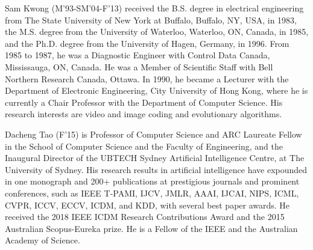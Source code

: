 \documentclass[journal]{IEEEtran}
\begin{document}
\vspace{-10 mm}
\begin{IEEEbiography}{Sam Kwong}
(M'93-SM'04-F'13) received the B.S. degree in electrical engineering from The State University of New York at Buffalo, Buffalo, NY, USA, in 1983, the M.S. degree from the University of Waterloo, Waterloo, ON, Canada, in 1985, and the Ph.D. degree from the University of Hagen, Germany, in 1996. From 1985 to 1987, he was a Diagnostic Engineer with Control Data Canada, Mississauga, ON, Canada. He was a Member of Scientific Staff with Bell Northern Research Canada, Ottawa. In 1990, he became a Lecturer with the Department of Electronic Engineering, City University of Hong Kong, where he is currently a Chair Professor with the Department of Computer Science. His research interests are video and image coding and evolutionary algorithms.
\end{IEEEbiography}
\vspace{-10 mm}
\begin{IEEEbiography}{Dacheng Tao}
(F'15) is Professor of Computer Science and ARC Laureate Fellow in the School of Computer Science and the Faculty of Engineering, and the Inaugural Director of the UBTECH Sydney Artificial Intelligence Centre, at The University of Sydney. His research results in artificial intelligence have expounded in one monograph and 200+ publications at prestigious journals and prominent conferences, such as IEEE T-PAMI, IJCV, JMLR, AAAI, IJCAI, NIPS, ICML, CVPR, ICCV, ECCV, ICDM, and KDD, with several best paper awards. He received the 2018 IEEE ICDM Research Contributions Award and the 2015 Australian Scopus-Eureka prize. He is a Fellow of the IEEE and the Australian Academy of Science.
\end{IEEEbiography}








\flushbottom
\end{document}
